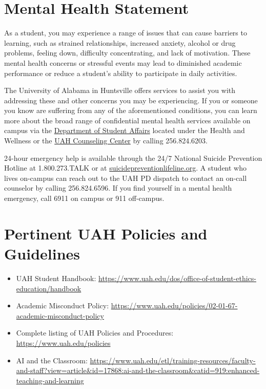 \documentclass[11pt,oneside,openany]{book}
\begin{document}
\chapter{Mental Health Statement}
As a student, you may experience a range of issues that can cause barriers to learning, such as strained relationships, increased anxiety, alcohol or drug problems, feeling down, difficulty concentrating, and lack of motivation. These mental health concerns or stressful events may lead to diminished academic performance or reduce a student's ability to participate in daily activities.

The University of Alabama in Huntsville offers services to assist you with addressing these and other concerns you may be experiencing. If you or someone you know are suffering from any of the aforementioned conditions, you can learn more about the broad range of confidential mental health services available on campus via the \href{https://www.uah.edu/dos}{Department of Student Affairs} located under the Health and Wellness or the \href{https://www.uah.edu/counseling-center}{UAH Counseling Center} by calling 256.824.6203.

\begin{notebox}
24-hour emergency help is available through the 24/7 National Suicide Prevention Hotline at 1.800.273.TALK or at \href{https://suicidepreventionlifeline.org/}{suicidepreventionlifeline.org}. A student who lives on-campus can reach out to the UAH PD dispatch to contact an on-call counselor by calling 256.824.6596. If you find yourself in a mental health emergency, call 6911 on campus or 911 off-campus.
\end{notebox}

\chapter{Pertinent UAH Policies and Guidelines}
\begin{itemize}
    \item UAH Student Handbook: \url{https://www.uah.edu/dos/office-of-student-ethics-education/handbook}
    \item Academic Misconduct Policy: \url{https://www.uah.edu/policies/02-01-67-academic-misconduct-policy}
    \item Complete listing of UAH Policies and Procedures: \url{https://www.uah.edu/policies}
    \item AI and the Classroom: \url{https://www.uah.edu/etl/training-resources/faculty-and-staff?view=article&id=17868:ai-and-the-classroom&catid=919:enhanced-teaching-and-learning}
\end{itemize}
\end{document}
